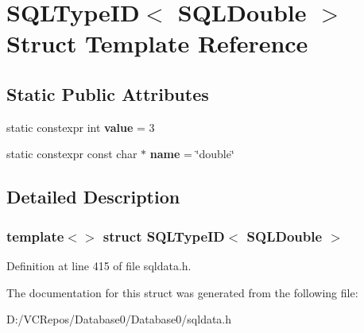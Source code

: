 \hypertarget{struct_s_q_l_type_i_d_3_01_s_q_l_double_01_4}{}\section{S\+Q\+L\+Type\+ID$<$ S\+Q\+L\+Double $>$ Struct Template Reference}
\label{struct_s_q_l_type_i_d_3_01_s_q_l_double_01_4}
\subsection*{Static Public Attributes}
\begin{DoxyCompactItemize}
\item 
\mbox{\label{struct_s_q_l_type_i_d_3_01_s_q_l_double_01_4_a0b2f2b6bde4f45291be513dfd969385a}} 
static constexpr int {\bfseries value} = 3
\item 
\mbox{\label{struct_s_q_l_type_i_d_3_01_s_q_l_double_01_4_ab97bb50197fd08d74697d5f8d921dd13}} 
static constexpr const char $\ast$ {\bfseries name} = \char`\"{}double\char`\"{}
\end{DoxyCompactItemize}


\subsection{Detailed Description}
\subsubsection*{template$<$$>$\newline
struct S\+Q\+L\+Type\+I\+D$<$ S\+Q\+L\+Double $>$}



Definition at line 415 of file sqldata.\+h.



The documentation for this struct was generated from the following file\+:\begin{DoxyCompactItemize}
\item 
D\+:/\+V\+C\+Repos/\+Database0/\+Database0/sqldata.\+h\end{DoxyCompactItemize}
